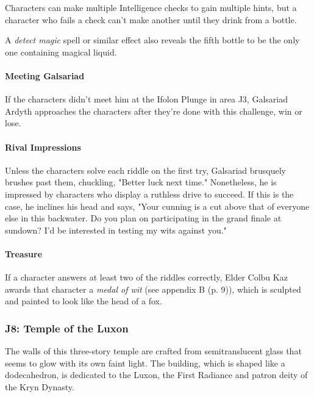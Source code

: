 \documentclass[letterpaper, 11pt, bg=full, twocolumn]{dndbook}
\begin{document}
Characters can make multiple Intelligence checks to gain multiple hints, but a character who fails a check can't make another until they drink from a bottle.

A \textit{detect magic} spell or similar effect also reveals the fifth bottle to be the only one containing magical liquid.

\paragraph{Meeting Galsariad}

If the characters didn't meet him at the Ifolon Plunge in area J3, Galsariad Ardyth approaches the characters after they're done with this challenge, win or lose.

\paragraph{Rival Impressions}

Unless the characters solve each riddle on the first try, Galsariad brusquely brushes past them, chuckling, "Better luck next time." Nonetheless, he is impressed by characters who display a ruthless drive to succeed. If this is the case, he inclines his head and says, "Your cunning is a cut above that of everyone else in this backwater. Do you plan on participating in the grand finale at sundown? I'd be interested in testing my wits against you."

\paragraph{Treasure}

If a character answers at least two of the riddles correctly, Elder Colbu Kaz awards that character a \textit{medal of wit} (see appendix B (p. 9)), which is sculpted and painted to look like the head of a fox.

\subsubsection{J8: Temple of the Luxon}

\begin{DndReadAloud}
The walls of this three-story temple are crafted from semitranslucent glass that seems to glow with its own faint light. The building, which is shaped like a dodecahedron, is dedicated to the Luxon, the First Radiance and patron deity of the Kryn Dynasty.
\end{DndReadAloud}
\end{document}
